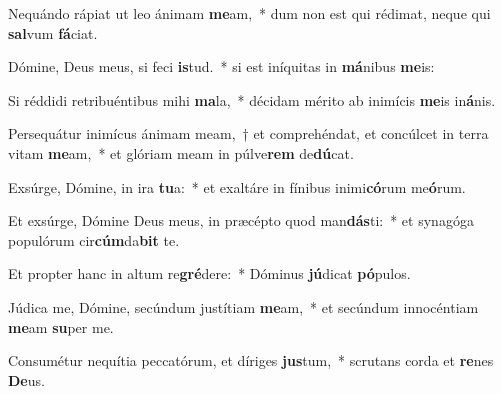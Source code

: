 \item Nequándo rápiat ut leo ánimam \textbf{me}am,~* dum non est qui rédimat, neque qui \textbf{sal}vum \textbf{fá}ciat.
\item Dómine, Deus meus, si feci \textbf{is}tud.~* si est iníquitas in \textbf{má}nibus \textbf{me}is:
\item Si réddidi retribuéntibus mihi \textbf{ma}la,~* décidam mérito ab inimícis \textbf{me}is in\textbf{á}nis.
\item Persequátur inimícus ánimam meam,~† et comprehéndat, et concúlcet in terra vitam \textbf{me}am,~* et glóriam meam in púlve\textbf{rem} de\textbf{dú}cat.
\item Exsúrge, Dómine, in ira \textbf{tu}a:~* et exaltáre in fínibus inimi\textbf{có}rum me\textbf{ó}rum.
\item Et exsúrge, Dómine Deus meus, in præcépto quod man\textbf{dás}ti:~* et synagóga populórum cir\textbf{cúm}da\textbf{bit} te.
\item Et propter hanc in altum re\textbf{gré}dere:~* Dóminus \textbf{jú}dicat \textbf{pó}pulos.
\item Júdica me, Dómine, secúndum justítiam \textbf{me}am,~* et secúndum innocéntiam \textbf{me}am \textbf{su}per me.
\item Consumétur nequítia peccatórum, et díriges \textbf{jus}tum,~* scrutans corda et \textbf{re}nes \textbf{De}us.
